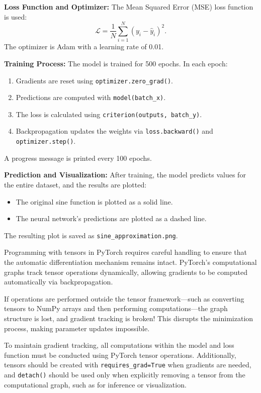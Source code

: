 \textbf{Loss Function and Optimizer:}  
The Mean Squared Error (MSE) loss function is used:
\begin{equation}
    \mathcal{L} = \frac{1}{N} \sum_{i=1}^{N} (y_i - \hat{y}_i)^2.
\end{equation}
The optimizer is Adam with a learning rate of 0.01.

\textbf{Training Process:}  
The model is trained for 500 epochs. In each epoch:
\begin{enumerate}
    \item Gradients are reset using \texttt{optimizer.zero\_grad()}.
    \item Predictions are computed with \texttt{model(batch\_x)}.
    \item The loss is calculated using \texttt{criterion(outputs, batch\_y)}.
    \item Backpropagation updates the weights via \texttt{loss.backward()} and \texttt{optimizer.step()}.
\end{enumerate}
A progress message is printed every 100 epochs.

\textbf{Prediction and Visualization:}  
After training, the model predicts values for the entire dataset, and the results are plotted:
\begin{itemize}
    \item The original sine function is plotted as a solid line.
    \item The neural network's predictions are plotted as a dashed line.
\end{itemize}
The resulting plot is saved as \texttt{sine\_approximation.png}.

Programming with tensors in PyTorch requires careful handling to ensure that the automatic differentiation mechanism remains intact. PyTorch’s computational graphs track tensor operations dynamically, allowing gradients to be computed automatically via backpropagation. 

If operations are performed outside the tensor framework—such as converting tensors to NumPy arrays and then performing computations—the graph structure is lost, and gradient tracking is broken! This disrupts the minimization process, making parameter updates impossible. 

To maintain gradient tracking, all computations within the model and loss function must be conducted using PyTorch tensor operations. Additionally, tensors should be created with \texttt{requires\_grad=True} when gradients are needed, and \texttt{detach()} should be used only when explicitly removing a tensor from the computational graph, such as for inference or visualization. 

